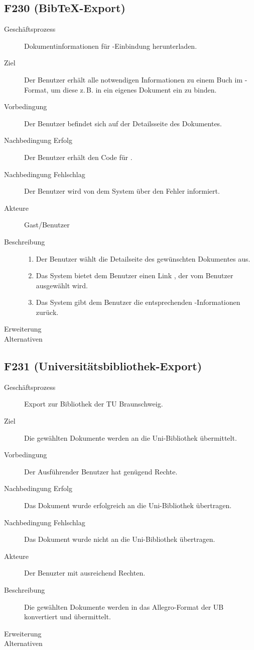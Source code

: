\subsection{F230 (Bib\TeX -Export)}
\begin{description}
  \item[Geschäftsprozess]Dokumentinformationen für \BibTeX-Einbindung herunterladen.
  \item[Ziel]Der Benutzer erhält alle notwendigen Informationen zu einem Buch im \BibTeX-Format, um diese z.\,B. in ein eigenes Dokument ein zu binden.
  \item[Vorbedingung]Der Benutzer befindet sich auf der Detailsseite des Dokumentes.
  \item[Nachbedingung Erfolg]Der Benutzer erhält den Code für \BibTeX .
  \item[Nachbedingung Fehlschlag]Der Benutzer wird von dem System über den Fehler informiert.
  \item[Akteure]Gast/Benutzer
  \item[Beschreibung]\hfill
    \begin{enumerate}
      \item Der Benutzer wählt die Detailseite des gewünschten Dokumentes aus.
      \item Das System bietet dem Benutzer einen Link \emph{\BibTeX}, der vom Benutzer ausgewählt wird.
      \item Das System gibt dem Benutzer die entsprechenden \BibTeX -Informationen zurück.
    \end{enumerate}
  \item[Erweiterung]
  \item[Alternativen]
\end{description}

\subsection{F231 (Universitätsbibliothek-Export)}
\begin{description}
  \item[Geschäftsprozess]Export zur Bibliothek der TU Braunschweig.
  \item[Ziel]Die gewählten Dokumente werden an die Uni-Bibliothek übermittelt.
  \item[Vorbedingung]Der Ausführender Benutzer hat genügend Rechte.
  \item[Nachbedingung Erfolg]Das Dokument wurde erfolgreich an die Uni-Bibliothek übertragen.
  \item[Nachbedingung Fehlschlag]Das Dokument wurde nicht an die Uni-Bibliothek übertragen.
  \item[Akteure]Der Benuzter mit ausreichend Rechten.
  \item[Beschreibung]Die gewählten Dokumente werden in das Allegro-Format der \gls{UB} konvertiert und übermittelt.
  \item[Erweiterung]
  \item[Alternativen]
\end{description}


